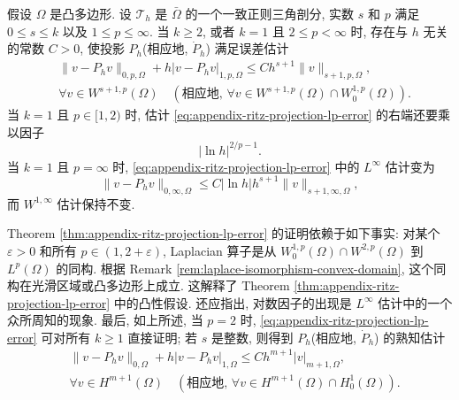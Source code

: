 \setcounter{statement}{1}
\begin{Theorem}\label{thm:appendix-ritz-projection-lp-error}
假设 $\Omega$ 是凸多边形. 设 $\mathcal{T}_h$ 是 $\bar\Omega$
的一个一致正则三角剖分, 实数 $s$ 和 $p$ 满足
$0\leq s\leq k$ 以及 $1\leq p\leq\infty$.
当 $k\geq2$, 或者 $k=1$ 且 $2\leq p<\infty$ 时,
存在与 $h$ 无关的常数 $C>0$, 使投影 $P_h$(相应地, $\dot P_h$)
满足误差估计
\begin{equation}\label{eq:appendix-ritz-projection-lp-error}
\begin{aligned}
&\|v-P_hv\|_{0,p,\Omega}
+h|v-P_hv|_{1,p,\Omega}
\leq
Ch^{s+1}\|v\|_{s+1,p,\Omega},\\
&\forall v\in W^{s+1,p}(\Omega)
\quad
(\text{相应地, }
\forall v\in W^{s+1,p}(\Omega)\cap W_0^{1,p}(\Omega)).
\end{aligned}
\end{equation}
当 $k=1$ 且 $p\in[1,2)$ 时, 估计
\eqref{eq:appendix-ritz-projection-lp-error} 的右端还要乘以因子
\[
|\ln h|^{2/p-1}.
\]
当 $k=1$ 且 $p=\infty$ 时,
\eqref{eq:appendix-ritz-projection-lp-error} 中的 $L^\infty$ 估计变为
\begin{equation}\label{eq:appendix-ritz-projection-linfty-error}
\|v-P_hv\|_{0,\infty,\Omega}
\leq
C|\ln h|h^{s+1}\|v\|_{s+1,\infty,\Omega},
\end{equation}
而 $W^{1,\infty}$ 估计保持不变.
\end{Theorem}

Theorem \ref{thm:appendix-ritz-projection-lp-error} 的证明依赖于如下事实:
对某个 $\varepsilon>0$ 和所有 $p\in(1,2+\varepsilon)$,
Laplacian 算子是从
$W_0^{1,p}(\Omega)\cap W^{2,p}(\Omega)$ 到 $L^p(\Omega)$ 的同构.
根据 Remark \ref{rem:laplace-isomorphism-convex-domain},
这个同构在光滑区域或凸多边形上成立.
这解释了 Theorem \ref{thm:appendix-ritz-projection-lp-error}
中的凸性假设. 还应指出, 对数因子的出现是 $L^\infty$ 估计中的一个
众所周知的现象. 最后, 如上所述, 当 $p=2$ 时,
\eqref{eq:appendix-ritz-projection-lp-error} 可对所有 $k\geq1$ 直接证明;
若 $s$ 是整数, 则得到 $P_h$(相应地, $\dot P_h$) 的熟知估计
\begin{equation}\label{eq:appendix-ritz-projection-h1-error}
\begin{aligned}
&\|v-P_hv\|_{0,\Omega}
+h|v-P_hv|_{1,\Omega}
\leq
Ch^{m+1}|v|_{m+1,\Omega},\\
&\forall v\in H^{m+1}(\Omega)
\quad
(\text{相应地, }
\forall v\in H^{m+1}(\Omega)\cap H_0^1(\Omega)).
\end{aligned}
\end{equation}

